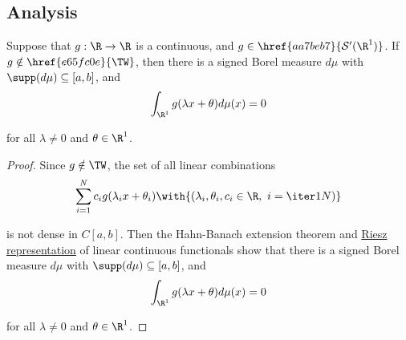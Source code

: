 \subsection{Analysis}\label{bde6bd5}

\Lemma{}

Suppose that $g:\R\to\R$ is a continuous, and $g\in\href{aa7beb7}{\mathcal
S'(\R^1)}$. If $g\notin\href{e65fc0e}{\TW}$, then there is a signed Borel
measure $d\mu$ with $\supp(d\mu)\subseteq[a,b]$, and
$$
  \int_{\R^1}g(\lambda x+\theta)d\mu(x)=0
$$

for all $\lambda\neq0$ and $\theta\in\R^1$.

\begin{proof}
  Since $g\notin\TW$, the set of all linear combinations
  $$
    \sum_{i=1}^Nc_ig(\lambda_ix+\theta_i)\with{(\lambda_i,\theta_i,c_i\in\R,\ i=\iter1N)}
  $$

  is not dense in $C[a,b]$. Then the Hahn-Banach extension theorem and
  \href{d9bde94}{Riesz representation} of linear continuous functionals show
  that there is a signed Borel measure $d\mu$ with $\supp(d\mu)\subseteq[a,b]$,
  and
  $$
    \int_{\R^1}g(\lambda x+\theta)d\mu(x)=0
  $$

  for all $\lambda\neq0$ and $\theta\in\R^1$.
\end{proof}
